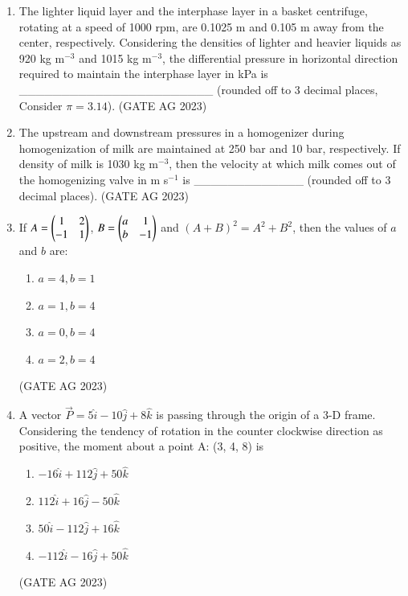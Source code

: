 \documentclass[journal,12pt,onecolumn]{IEEEtran}
\theoremstyle{remark}
\begin{document}
\begin{enumerate}
    \item The lighter liquid layer and the interphase layer in a basket centrifuge, rotating at a speed of 1000 rpm, are 0.1025 m and 0.105 m away from the center, respectively. Considering the densities of lighter and heavier liquids as 920 kg m$^{-3}$ and 1015 kg m$^{-3}$, the differential pressure in horizontal direction required to maintain the interphase layer in kPa is \_\_\_\_\_\_\_\_\_\_\_\_\_\_\_\_\_\_\_\_\_\_\_ (rounded off to 3 decimal places, Consider $\pi = 3.14$).
\hfill{(GATE AG 2023)}

    \item The upstream and downstream pressures in a homogenizer during homogenization of milk are maintained at 250 bar and 10 bar, respectively. If density of milk is 1030 kg m$^{-3}$, then the velocity at which milk comes out of the homogenizing valve in m s$^{-1}$ is \_\_\_\_\_\_\_\_\_\_\_\_\_ (rounded off to 3 decimal places).
    \hfill{(GATE AG 2023)}

    \item If $A = \begin{pmatrix}1 & 2 \\ -1 & 1\end{pmatrix}$, $B = \begin{pmatrix}a & 1 \\ b & -1\end{pmatrix}$ and $(A+B)^{2} = A^{2} + B^{2}$, then the values of $a$ and $b$ are:
    \begin{multicols}{2}
    \begin{enumerate}
        \item $a = 4, b = 1$
        \item $a = 1, b = 4$
        \item $a = 0, b = 4$
        \item $a = 2, b = 4$
    \end{enumerate}
    \end{multicols}
\hfill{(GATE AG 2023)}

    \item A vector $\vec{P} = 5\hat{i} - 10\hat{j} + 8\hat{k}$ is passing through the origin of a 3-D frame. Considering the tendency of rotation in the counter clockwise direction as positive, the moment about a point A: (3, 4, 8) is
    \begin{multicols}{2}
    \begin{enumerate}
        \item $-16\hat{i} + 112\hat{j} + 50\hat{k}$
        \item $112\hat{i} + 16\hat{j} - 50\hat{k}$
        \item $50\hat{i} - 112\hat{j} + 16\hat{k}$
        \item $-112\hat{i} - 16\hat{j} + 50\hat{k}$
    \end{enumerate}
    \end{multicols}
\hfill{(GATE AG 2023)}


\end{enumerate}
\end{document}
